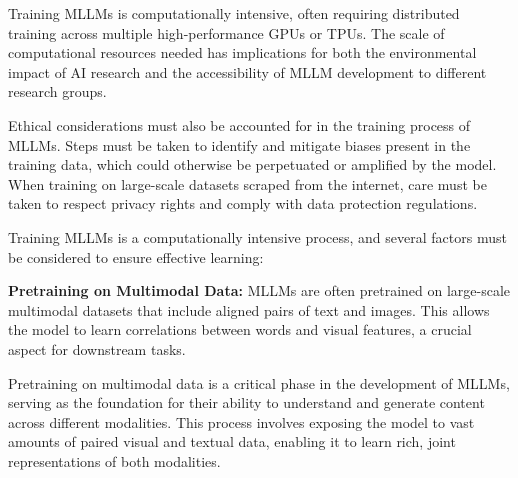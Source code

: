 Training MLLMs is computationally intensive, often requiring distributed training across multiple high-performance GPUs or TPUs. The scale of computational resources needed has implications for both the environmental impact of AI research and the accessibility of MLLM development to different research groups.

Ethical considerations must also be accounted for in the training process of MLLMs. Steps must be taken to identify and mitigate biases present in the training data, which could otherwise be perpetuated or amplified by the model. When training on large-scale datasets scraped from the internet, care must be taken to respect privacy rights and comply with data protection regulations.

Training MLLMs is a computationally intensive process, and several factors must be considered to ensure effective learning:

\textbf{Pretraining on Multimodal Data:} MLLMs are often pretrained on large-scale multimodal datasets that include aligned pairs of text and images. This allows the model to learn correlations between words and visual features, a crucial aspect for downstream tasks.

Pretraining on multimodal data is a critical phase in the development of MLLMs, serving as the foundation for their ability to understand and generate content across different modalities. This process involves exposing the model to vast amounts of paired visual and textual data, enabling it to learn rich, joint representations of both modalities.

